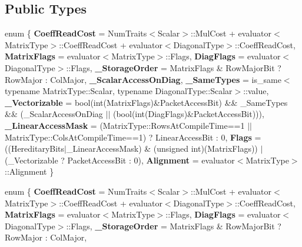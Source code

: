 \subsection*{Public Types}
\begin{DoxyCompactItemize}
\item 
\mbox{\label{struct_eigen_1_1internal_1_1diagonal__product__evaluator__base_adbe4df92a8085f6718e53ebf726f2337}} 
enum \{ \newline
{\bfseries Coeff\+Read\+Cost} = Num\+Traits$<$Scalar$>$\+:\+:Mul\+Cost + evaluator$<$Matrix\+Type$>$\+:\+:Coeff\+Read\+Cost + evaluator$<$Diagonal\+Type$>$\+:\+:Coeff\+Read\+Cost, 
{\bfseries Matrix\+Flags} = evaluator$<$Matrix\+Type$>$\+:\+:Flags, 
{\bfseries Diag\+Flags} = evaluator$<$Diagonal\+Type$>$\+:\+:Flags, 
{\bfseries \+\_\+\+Storage\+Order} = Matrix\+Flags \& Row\+Major\+Bit ? Row\+Major \+: Col\+Major, 
\newline
{\bfseries \+\_\+\+Scalar\+Access\+On\+Diag}, 
{\bfseries \+\_\+\+Same\+Types} = is\+\_\+same$<$typename Matrix\+Type\+:\+:Scalar, typename Diagonal\+Type\+:\+:Scalar$>$\+:\+:value, 
{\bfseries \+\_\+\+Vectorizable} = bool(int(Matrix\+Flags)\&Packet\+Access\+Bit) \&\& \+\_\+\+Same\+Types \&\& (\+\_\+\+Scalar\+Access\+On\+Diag $\vert$$\vert$ (bool(int(Diag\+Flags)\&Packet\+Access\+Bit))), 
{\bfseries \+\_\+\+Linear\+Access\+Mask} = (Matrix\+Type\+:\+:Rows\+At\+Compile\+Time==1 $\vert$$\vert$ Matrix\+Type\+:\+:Cols\+At\+Compile\+Time==1) ? Linear\+Access\+Bit \+: 0, 
\newline
{\bfseries Flags} = ((Hereditary\+Bits$\vert$\+\_\+\+Linear\+Access\+Mask) \& (unsigned int)(Matrix\+Flags)) $\vert$ (\+\_\+\+Vectorizable ? Packet\+Access\+Bit \+: 0), 
{\bfseries Alignment} = evaluator$<$Matrix\+Type$>$\+:\+:Alignment
 \}
\item 
\mbox{\label{struct_eigen_1_1internal_1_1diagonal__product__evaluator__base_aac2075896a664c8401bc65f8fdce3938}} 
enum \{ \newline
{\bfseries Coeff\+Read\+Cost} = Num\+Traits$<$Scalar$>$\+:\+:Mul\+Cost + evaluator$<$Matrix\+Type$>$\+:\+:Coeff\+Read\+Cost + evaluator$<$Diagonal\+Type$>$\+:\+:Coeff\+Read\+Cost, 
{\bfseries Matrix\+Flags} = evaluator$<$Matrix\+Type$>$\+:\+:Flags, 
{\bfseries Diag\+Flags} = evaluator$<$Diagonal\+Type$>$\+:\+:Flags, 
{\bfseries \+\_\+\+Storage\+Order} = Matrix\+Flags \& Row\+Major\+Bit ? Row\+Major \+: Col\+Major, 

\end{DoxyCompactItemize}
